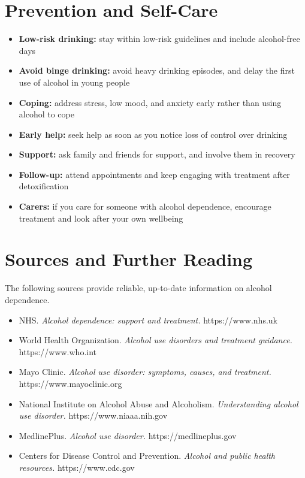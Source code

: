 \section*{Prevention and Self-Care}
\begin{itemize}
    \item \textbf{Low-risk drinking:} stay within low-risk guidelines and include alcohol-free days
    \item \textbf{Avoid binge drinking:} avoid heavy drinking episodes, and delay the first use of alcohol in young people
    \item \textbf{Coping:} address stress, low mood, and anxiety early rather than using alcohol to cope
    \item \textbf{Early help:} seek help as soon as you notice loss of control over drinking
    \item \textbf{Support:} ask family and friends for support, and involve them in recovery
    \item \textbf{Follow-up:} attend appointments and keep engaging with treatment after detoxification
    \item \textbf{Carers:} if you care for someone with alcohol dependence, encourage treatment and look after your own wellbeing
\end{itemize}

\section*{Sources and Further Reading}
The following sources provide reliable, up-to-date information on alcohol dependence.

\begin{itemize}
    \item NHS. \textit{Alcohol dependence: support and treatment.} https://www.nhs.uk
    \item World Health Organization. \textit{Alcohol use disorders and treatment guidance.} https://www.who.int
    \item Mayo Clinic. \textit{Alcohol use disorder: symptoms, causes, and treatment.} https://www.mayoclinic.org
    \item National Institute on Alcohol Abuse and Alcoholism. \textit{Understanding alcohol use disorder.} https://www.niaaa.nih.gov
    \item MedlinePlus. \textit{Alcohol use disorder.} https://medlineplus.gov
    \item Centers for Disease Control and Prevention. \textit{Alcohol and public health resources.} https://www.cdc.gov
\end{itemize}
